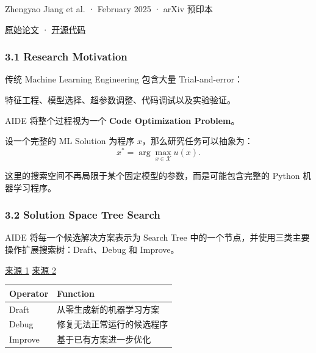Zhengyao Jiang et al. · February 2025 · arXiv 预印本

\href{https://arxiv.org/abs/2502.13138}{原始论文} · \href{https://github.com/wecoai/aideml}{开源代码}

\hypertarget{part-3-44-0001-research-motivation}{%
\subsubsection{3.1 Research Motivation}\label{part-3-44-0001-research-motivation}}

传统 Machine Learning Engineering 包含大量 Trial-and-error：

特征工程、模型选择、超参数调整、代码调试以及实验验证。

AIDE 将整个过程视为一个 \textbf{Code Optimization Problem}。

设一个完整的 ML Solution 为程序 \(x\)，那么研究任务可以抽象为：
\[x^*=\arg\max_{x\in\mathcal X}u(x).\]

这里的搜索空间不再局限于某个固定模型的参数，而是可能包含完整的 Python 机器学习程序。

\hypertarget{part-3-44-0001-solution-space-tree-search}{%
\subsubsection{3.2 Solution Space Tree Search}\label{part-3-44-0001-solution-space-tree-search}}

AIDE 将每一个候选解决方案表示为 Search Tree 中的一个节点，并使用三类主要操作扩展搜索树：Draft、Debug 和 Improve。

\href{https://arxiv.org/html/2502.13138v1}{来源 1} \href{https://arxiv.org/html/2502.13138v1}{来源 2}


\begin{readertable}
\begin{longtable}[]{@{}
  >{\raggedright\arraybackslash}p{}
  >{\raggedright\arraybackslash}p{}@{}}
\toprule
Operator & Function \\
\midrule
\endhead
Draft & 从零生成新的机器学习方案 \\
Debug & 修复无法正常运行的候选程序 \\
Improve & 基于已有方案进一步优化 \\
\bottomrule
\end{longtable}
\end{readertable}

